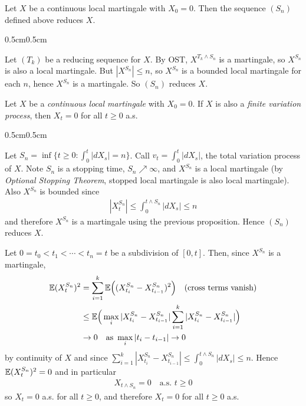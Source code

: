 \documentclass[12pt,a4paper]{article}
\newenvironment{proof}
{\begin{changemargin}{0.5cm}{0.5cm} 
	}%
	{\end{changemargin}
}
\newenvironment{p}
{\begin{proof} 
	}%
	{\end{proof}
}
\begin{document}
\prop Let $X$ be a continuous local martingale with $X_0 =0$. Then the sequence $(S_n)$ defined above reduces $X$.
\begin{p}
\pf Let $(T_k)$ be a reducing sequence for $X$. By OST, $X^{T_k \wedge S_n}$ is a martingale, so $X^{S_n}$ is also a local martingale. But $|X^{S_n}|\leq n$, so $X^{S_n}$ is a bounded local martingale for each $n$, hence $X^{S_n}$ is a martingale. So $(S_n)$ reduces $X$.

\eop
\end{p}
\s

\thm Let $X$ be a \emph{continuous local martingale} with $X_0 =0$. If $X$ is also a \emph{finite variation process}, then $X_t =0$ for all $t\geq 0$ a.s.
\begin{p}
\pf Let $S_n = \inf \{t\geq 0 : \int_0^t |dX_s| =n \}$. Call $v_t = \int_0^t |dX_s|$, the total variation process of $X$. Note $S_n$ is a stopping time, $S_n \nearrow \infty$, and $X^{S_n}$ is a local martingale (by \emph{Optional Stopping Theorem}, stopped local martingale is also local martingale). Also $X^{S_n}$ is bounded since 
\begin{align*}
|X_t^{S_n}| \leq \int_0^{t\wedge S_n} |dX_s| \leq n
\end{align*}
and therefore $X^{S_n}$ is a martingale using the previous proposition. Hence $(S_n)$ reduces $X$.

\quad Let $0=t_0 < t_1<\cdots < t_n =t$ be a subdivision of $[0,t]$. Then, since $X^{S_n}$ is a martingale,
\begin{align*}
\mathbb{E} (X_t^{S_n})^2 &= \sum_{i=1}^k \mathbb{E} \Big( (X_{t_i}^{S_n} - X_{t_{i-1}}^{S_n})^2\Big)\quad  \text{(cross terms vanish)} \\
&\leq \mathbb{E} \Big( \max_i |X_{t_i}^{S_n} - X_{t_{i-1}}^{S_n}| \sum_{i=1}^k |X_{t_i}^{S_n} - X_{t_{i-1}}^{S_n}|\Big) \\
&\rightarrow 0 \quad \text{as } \max_i |t_i - t_{i-1}| \rightarrow 0
\end{align*}
by continuity of $X$ and since $\sum_{i=1}^k |X_{t_i}^{S_n} - X_{t_{i-1}}^{S_n}| \leq \int_0^{t\wedge S_n} |dX_s| \leq n$. Hence $\mathbb{E} (X_t^{S_n})^2 =0$ and in particular
\begin{align*}
X_{t\wedge S_n} =0 \quad \text{a.s.} \,\, t\geq 0
\end{align*}
so $X_t =0$ a.s. for all $t\geq 0$, and therefore $X_t =0$ for all $t\geq 0$ a.s.

\eop
\end{p}
\s

\newday
\end{document}
